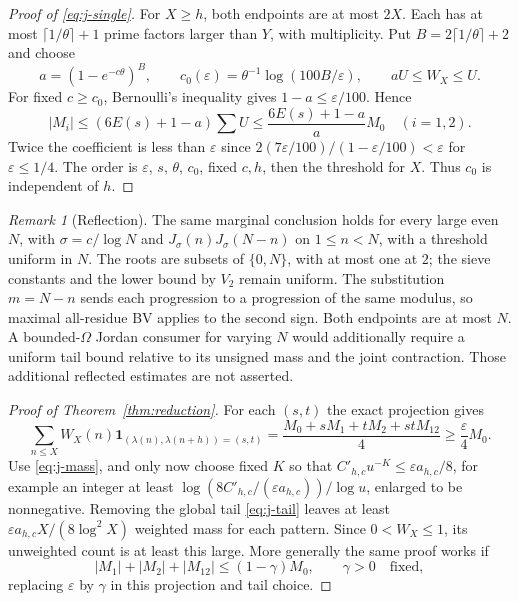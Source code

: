 \documentclass[11pt]{article}
\theoremstyle{definition}
\newcommand{\ind}{\mathbf 1}
\theoremstyle{remark}
\newtheorem{remark}[theorem]{Remark}
\numberwithin{equation}{section}
\begin{document}
\begin{proof}[Proof of \eqref{eq:j-single}]
For $X\ge h$, both endpoints are at most $2X$. Each has at most $\lceil1/\theta\rceil+1$ prime factors
larger than $Y$, with multiplicity. Put $B=2\lceil1/\theta\rceil+2$ and choose
\begin{equation}\label{eq:a-constant-order}
 a=(1-e^{-c\theta})^B,\qquad c_0(\varepsilon)=\theta^{-1}\log(100B/\varepsilon),\qquad
 aU\le W_X\le U.
\end{equation}
For fixed $c\ge c_0$, Bernoulli's inequality gives $1-a\le\varepsilon/100$. Hence
\begin{equation}\label{eq:a-full-sign}
 |M_i|\le(6E(s)+1-a)\sum U\le\frac{6E(s)+1-a}{a}M_0\quad(i=1,2).
\end{equation}
Twice the coefficient is less than $\varepsilon$ since
$2(7\varepsilon/100)/(1-\varepsilon/100)<\varepsilon$ for $\varepsilon\le1/4$.
The order is $\varepsilon$, $s$, $\theta$, $c_0$, fixed $c,h$, then the threshold for $X$.
Thus $c_0$ is independent of $h$.
\end{proof}
\begin{remark}[Reflection]\label{rem:a-reflection}
The same marginal conclusion holds for every large even $N$, with $\sigma=c/\log N$ and
$J_\sigma(n)J_\sigma(N-n)$ on $1\le n<N$, with a threshold uniform in $N$.
The roots are subsets of $\{0,N\}$, with at most one at $2$; the sieve constants and the lower bound
by $V_2$ remain uniform. The substitution $m=N-n$ sends each progression to a progression of the same
modulus, so maximal all-residue BV applies to the second sign. Both endpoints are at most $N$.
A bounded-$\Omega$ Jordan consumer for varying $N$ would additionally require a uniform tail bound
relative to its unsigned mass and the joint contraction. Those additional reflected estimates are not asserted.
\end{remark}
\begin{proof}[Proof of Theorem~\ref{thm:reduction}]
For each $(s,t)$ the exact projection gives
\begin{equation}\label{eq:a-sign-projection}
 \sum_{n\le X}W_X(n)\ind_{(\lambda(n),\lambda(n+h))=(s,t)}
 =\frac{M_0+sM_1+tM_2+stM_{12}}4\ge\frac\varepsilon4M_0.
\end{equation}
Use \eqref{eq:j-mass}, and only now choose fixed $K$ so that
$C'_{h,c}u^{-K}\le\varepsilon a_{h,c}/8$, for example an integer at least
$\log(8C'_{h,c}/(\varepsilon a_{h,c}))/\log u$, enlarged to be nonnegative.
Removing the global tail \eqref{eq:j-tail} leaves at least
$\varepsilon a_{h,c}X/(8\log^2X)$ weighted mass for each pattern. Since $0<W_X\le1$,
its unweighted count is at least this large. More generally the same proof works if
\begin{equation}\label{eq:a-general-contraction}
 |M_1|+|M_2|+|M_{12}|\le(1-\gamma)M_0,\qquad\gamma>0\quad\text{fixed},
\end{equation}
replacing $\varepsilon$ by $\gamma$
in this projection and tail choice.
\end{proof}
\end{document}
